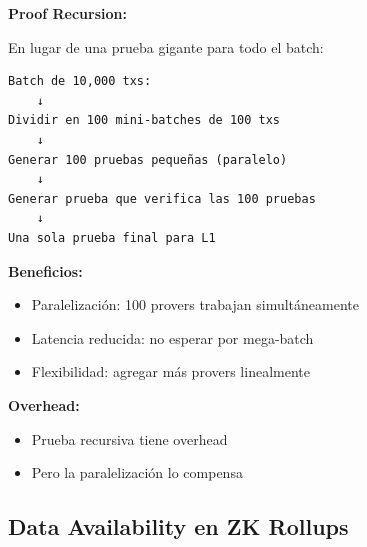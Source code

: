 \documentclass[11pt,a4paper,twoside,openright]{book}
\theoremstyle{definition}
\theoremstyle{plain}
\theoremstyle{remark}
\begin{document}
\begin{mathnote}
\textbf{Proof Recursion:}

En lugar de una prueba gigante para todo el batch:

\begin{verbatim}
Batch de 10,000 txs:
    ↓
Dividir en 100 mini-batches de 100 txs
    ↓
Generar 100 pruebas pequeñas (paralelo)
    ↓
Generar prueba que verifica las 100 pruebas
    ↓
Una sola prueba final para L1
\end{verbatim}

\textbf{Beneficios:}
\begin{itemize}
    \item Paralelización: 100 provers trabajan simultáneamente
    \item Latencia reducida: no esperar por mega-batch
    \item Flexibilidad: agregar más provers linealmente
\end{itemize}

\textbf{Overhead:}
\begin{itemize}
    \item Prueba recursiva tiene overhead
    \item Pero la paralelización lo compensa
\end{itemize}
\end{mathnote}

\subsection{Data Availability en ZK Rollups}
\end{document}
